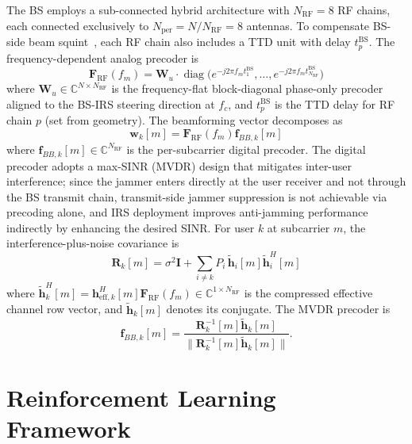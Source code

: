 \documentclass[journal,twocolumn]{IEEEtran}
\newcommand{\vect}[1]{\mathbf{#1}}
\newcommand{\mat}[1]{\mathbf{#1}}
\newcommand{\C}{\mathbb{C}}
\DeclareMathOperator{\diag}{diag}
\begin{document}
The BS employs a sub-connected hybrid architecture with $N_{\text{RF}} = 8$ RF chains, each connected exclusively to $N_{\text{per}} = N/N_{\text{RF}} = 8$ antennas. To compensate BS-side beam squint~\cite{su2023wideband}, each RF chain also includes a TTD unit with delay $t_p^{\text{BS}}$. The frequency-dependent analog precoder is
\begin{equation}
\mat{F}_{\text{RF}}(f_m) = \mat{W}_u \cdot \diag\!\bigl(e^{-j2\pi f_m t_1^{\text{BS}}}, \ldots, e^{-j2\pi f_m t_{N_{\text{RF}}}^{\text{BS}}}\bigr)
\label{eq:frf_ttd}
\end{equation}
where $\mat{W}_u \in \C^{N \times N_{\text{RF}}}$ is the frequency-flat block-diagonal phase-only precoder aligned to the BS-IRS steering direction at $f_c$, and $t_p^{\text{BS}}$ is the TTD delay for RF chain $p$ (set from geometry). The beamforming vector decomposes as
\begin{equation}
\vect{w}_k[m] = \mat{F}_{\text{RF}}(f_m) \vect{f}_{BB,k}[m]
\label{eq:hybrid_bf}
\end{equation}
where $\vect{f}_{BB,k}[m] \in \C^{N_{\text{RF}}}$ is the per-subcarrier digital precoder. The digital precoder adopts a max-SINR (MVDR) design that mitigates inter-user interference; since the jammer enters directly at the user receiver and not through the BS transmit chain, transmit-side jammer suppression is not achievable via precoding alone, and IRS deployment improves anti-jamming performance indirectly by enhancing the desired SINR. For user $k$ at subcarrier $m$, the interference-plus-noise covariance is
\begin{equation}
\mat{R}_k[m] = \sigma^2\mat{I} + \sum_{i \neq k}P_i\,\tilde{\vect{h}}_i[m]\tilde{\vect{h}}_i^H[m]
\label{eq:Rk}
\end{equation}
where $\tilde{\vect{h}}_k^H[m] = \vect{h}_{\text{eff},k}^H[m]\mat{F}_{\text{RF}}(f_m) \in \C^{1 \times N_{\text{RF}}}$ is the compressed effective channel row vector, and $\tilde{\vect{h}}_k[m]$ denotes its conjugate. The MVDR precoder is
\begin{equation}
\vect{f}_{BB,k}[m] = \frac{\mat{R}_k^{-1}[m]\tilde{\vect{h}}_k[m]}{\|\mat{R}_k^{-1}[m]\tilde{\vect{h}}_k[m]\|}.
\label{eq:mvdr}
\end{equation}

\section{Reinforcement Learning Framework}
\label{sec:rl}
\end{document}
